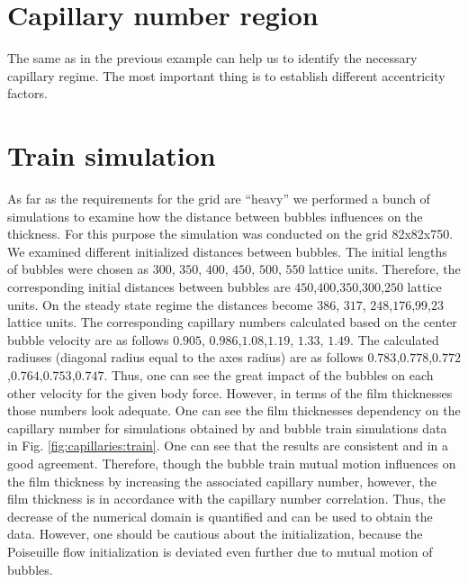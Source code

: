 \documentclass{article}
\begin{document}
\section{Capillary number region}
The same as in the previous example can help us to identify the necessary capillary regime. The
most important thing is to establish different accentricity factors.

\section{Train simulation}
As far as the requirements for the grid are ``heavy'' we performed a bunch of simulations to
examine how the distance between bubbles influences on the thickness. For this purpose the
simulation was conducted on the grid 82x82x750. We examined different initialized distances between
bubbles. The initial lengths of bubbles were chosen as $300$, $350$, $400$, $450$, $500$, $550$
lattice units. Therefore, the corresponding initial distances between bubbles are
$450$,$400$,$350$,$300$,$250$ lattice units. On the steady state regime the distances become $386$,
$317$, $248$,$176$,$99$,$23$ lattice units. The corresponding capillary numbers calculated based on
the center bubble velocity are as follows $0.905$, $0.986$,$1.08$,$1.19$, $1.33$, $1.49$. The
calculated radiuses (diagonal radius equal to the axes radius) are as follows
$0.783$,$0.778$,$0.772$,$0.764$,$0.753$,$0.747$. Thus, one can see the great impact of the bubbles
on each other velocity for the given body force. However, in terms of the film thicknesses those
numbers look adequate. One can see the film thicknesses dependency on the capillary number for
simulations obtained by \citet{heil-threedim} and bubble train simulations data in Fig.
\ref{fig:capillaries:train}. One can see that the results are consistent and in a good agreement.
Therefore, though the bubble train mutual motion influences on the film thickness by increasing the
associated capillary number,  however, the film thickness is in accordance with the capillary
number correlation. Thus, the decrease of the numerical domain is quantified and can be used to
obtain the data. However, one should be cautious about the initialization, because the Poiseuille
flow initialization is deviated even further due to mutual motion of bubbles.
\end{document}
